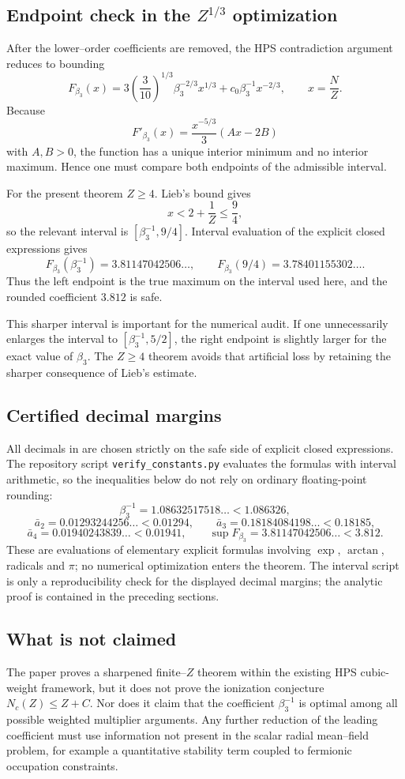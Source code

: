 \subsection{Endpoint check in the $Z^{1/3}$ optimization}

After the lower--order coefficients are removed, the HPS contradiction argument reduces to bounding
\[
 F_{\beta_3}(x)
 =
 3\left(\frac3{10}\right)^{1/3}\beta_3^{-2/3}x^{1/3}
 +c_0\beta_3^{-1}x^{-2/3},
 \qquad x=\frac NZ.
\]
Because
\[
 F'_{\beta_3}(x)
 =\frac{x^{-5/3}}{3}(Ax-2B)
\]
with $A,B>0$, the function has a unique interior minimum and no interior maximum.  Hence one must compare both endpoints of the admissible interval.

For the present theorem $Z\ge4$.  Lieb's bound gives
\[
 x<2+\frac1Z\le\frac94,
\]
so the relevant interval is $[\beta_3^{-1},9/4]$.  Interval evaluation of the explicit closed expressions gives
\[
 F_{\beta_3}(\beta_3^{-1})
 =3.81147042506\ldots,
 \qquad
 F_{\beta_3}(9/4)
 =3.78401155302\ldots.
\]
Thus the left endpoint is the true maximum on the interval used here, and the rounded coefficient $3.812$ is safe.

This sharper interval is important for the numerical audit.  If one unnecessarily enlarges the interval to $[\beta_3^{-1},5/2]$, the right endpoint is slightly larger for the exact value of $\beta_3$.  The $Z\ge4$ theorem avoids that artificial loss by retaining the sharper consequence of Lieb's estimate.

\subsection{Certified decimal margins}

All decimals in  are chosen strictly on the safe side of explicit closed expressions.  The repository script \texttt{verify\_constants.py} evaluates the formulas with interval arithmetic, so the inequalities below do not rely on ordinary floating-point rounding:
\[
 \beta_3^{-1}=1.08632517518\ldots<1.086326,
\]
\[
 \bar a_2=0.01293244256\ldots<0.01294,\qquad
 \bar a_3=0.18184084198\ldots<0.18185,
\]
\[
 \bar a_4=0.01940243839\ldots<0.01941,
 \qquad
 \sup F_{\beta_3}=3.81147042506\ldots<3.812.
\]
These are evaluations of elementary explicit formulas involving $\exp$, $\arctan$, radicals and $\pi$; no numerical optimization enters the theorem.  The interval script is only a reproducibility check for the displayed decimal margins; the analytic proof is contained in the preceding sections.

\subsection{What is not claimed}

The paper proves a sharpened finite--$Z$ theorem within the existing HPS cubic-weight framework, but it does not prove the ionization conjecture $N_c(Z)\le Z+C$.  Nor does it claim that the coefficient $\beta_3^{-1}$ is optimal among all possible weighted multiplier arguments.  Any further reduction of the leading coefficient must use information not present in the scalar radial mean--field problem, for example a quantitative stability term coupled to fermionic occupation constraints.
